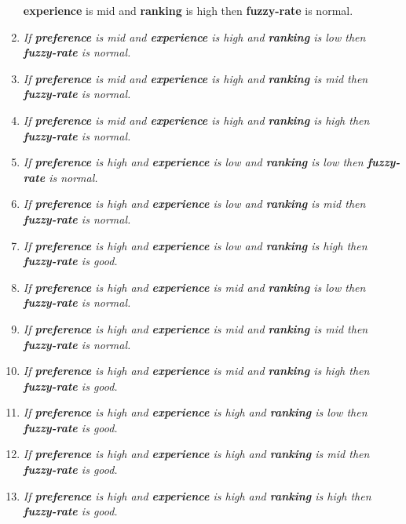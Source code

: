 \begin{enumerate}
{\textbf{experience} is mid and \textbf{ranking} is high then \textbf{fuzzy-rate} is normal.}
\item \textit{If \textbf{preference} is mid and 
\textbf{experience} is high and \textbf{ranking} is low then \textbf{fuzzy-rate} is normal.}
\item \textit{If \textbf{preference} is mid and 
\textbf{experience} is high and \textbf{ranking} is mid then \textbf{fuzzy-rate} is normal.}
\item \textit{If \textbf{preference} is mid and 
\textbf{experience} is high and \textbf{ranking} is high then \textbf{fuzzy-rate} is normal.}
\item \textit{If \textbf{preference} is high and 
\textbf{experience} is low and \textbf{ranking} is low then \textbf{fuzzy-rate} is normal.}\
\item \textit{If \textbf{preference} is high and 
\textbf{experience} is low and \textbf{ranking} is mid then \textbf{fuzzy-rate} is normal.}\
\item \textit{If \textbf{preference} is high and 
\textbf{experience} is low and \textbf{ranking} is high then \textbf{fuzzy-rate} is good.}\
\item \textit{If \textbf{preference} is high and 
\textbf{experience} is mid and \textbf{ranking} is low then \textbf{fuzzy-rate} is normal.}\
\item \textit{If \textbf{preference} is high and 
\textbf{experience} is mid and \textbf{ranking} is mid then \textbf{fuzzy-rate} is normal.}\
\item \textit{If \textbf{preference} is high and 
\textbf{experience} is mid and \textbf{ranking} is high then \textbf{fuzzy-rate} is good.}\
\item \textit{If \textbf{preference} is high and 
\textbf{experience} is high and \textbf{ranking} is low then \textbf{fuzzy-rate} is good.}\
\item \textit{If \textbf{preference} is high and 
\textbf{experience} is high and \textbf{ranking} is mid then \textbf{fuzzy-rate} is good.}\
\item \textit{If \textbf{preference} is high and 
\textbf{experience} is high and \textbf{ranking} is high then \textbf{fuzzy-rate} is good.}\

\end{enumerate} 

